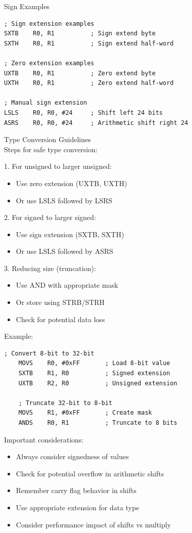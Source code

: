 \begin{example2}{Sign Examples}
\begin{lstlisting}[language=armasm, style=basesmol]
; Sign extension examples
SXTB    R0, R1          ; Sign extend byte
SXTH    R0, R1          ; Sign extend half-word

; Zero extension examples
UXTB    R0, R1          ; Zero extend byte
UXTH    R0, R1          ; Zero extend half-word

; Manual sign extension
LSLS    R0, R0, #24     ; Shift left 24 bits
ASRS    R0, R0, #24     ; Arithmetic shift right 24
\end{lstlisting}
\end{example2}

\begin{KR}{Type Conversion Guidelines}\\
Steps for safe type conversion:


1. For unsigned to larger unsigned:
\begin{itemize}
  \item Use zero extension (UXTB, UXTH)
  \item Or use LSLS followed by LSRS
\end{itemize}

2. For signed to larger signed:
\begin{itemize}
  \item Use sign extension (SXTB, SXTH)
  \item Or use LSLS followed by ASRS
\end{itemize}


3. Reducing size (truncation):
\begin{itemize}
  \item Use AND with appropriate mask
  \item Or store using STRB/STRH
  \item Check for potential data loss
\end{itemize}


Example:
\begin{lstlisting}[language=armasm, style=basesmol]
    ; Convert 8-bit to 32-bit
    MOVS    R0, #0xFF       ; Load 8-bit value
    SXTB    R1, R0          ; Signed extension
    UXTB    R2, R0          ; Unsigned extension
    
    ; Truncate 32-bit to 8-bit
    MOVS    R1, #0xFF       ; Create mask
    ANDS    R0, R1          ; Truncate to 8 bits
\end{lstlisting}
\end{KR}

\begin{remark}
Important considerations:
\begin{itemize}
  \item Always consider signedness of values
  \item Check for potential overflow in arithmetic shifts
  \item Remember carry flag behavior in shifts
  \item Use appropriate extension for data type
  \item Consider performance impact of shifts vs multiply
\end{itemize}
\end{remark}

